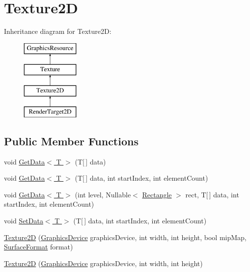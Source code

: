 \hypertarget{classMicrosoft_1_1Xna_1_1Framework_1_1Graphics_1_1Texture2D}{}\section{Texture2\+D}
\label{classMicrosoft_1_1Xna_1_1Framework_1_1Graphics_1_1Texture2D}
Inheritance diagram for Texture2\+D\+:\begin{figure}[H]
\begin{center}
\leavevmode
\includegraphics[height=4.000000cm]{classMicrosoft_1_1Xna_1_1Framework_1_1Graphics_1_1Texture2D}
\end{center}
\end{figure}
\subsection*{Public Member Functions}
\begin{DoxyCompactItemize}
\item 
void \hyperlink{classMicrosoft_1_1Xna_1_1Framework_1_1Graphics_1_1Texture2D_a4db4193c54536769560bdfec04150c1c}{Get\+Data$<$ T $>$} (T\mbox{[}$\,$\mbox{]} data)
\item 
void \hyperlink{classMicrosoft_1_1Xna_1_1Framework_1_1Graphics_1_1Texture2D_a7071a7e7f3c06f2f49080c2b5a18c87f}{Get\+Data$<$ T $>$} (T\mbox{[}$\,$\mbox{]} data, int start\+Index, int element\+Count)
\item 
void \hyperlink{classMicrosoft_1_1Xna_1_1Framework_1_1Graphics_1_1Texture2D_a48b43f20d59d4c2fe852c538f36e3e23}{Get\+Data$<$ T $>$} (int level, Nullable$<$ \hyperlink{structMicrosoft_1_1Xna_1_1Framework_1_1Rectangle}{Rectangle} $>$ rect, T\mbox{[}$\,$\mbox{]} data, int start\+Index, int element\+Count)
\item 
void \hyperlink{classMicrosoft_1_1Xna_1_1Framework_1_1Graphics_1_1Texture2D_af72400eac2ea582c9a148d1932182bc7}{Set\+Data$<$ T $>$} (T\mbox{[}$\,$\mbox{]} data, int start\+Index, int element\+Count)
\item 
\hyperlink{classMicrosoft_1_1Xna_1_1Framework_1_1Graphics_1_1Texture2D_a48893cead2a8a0961cb97894eb8a6d73}{Texture2\+D} (\hyperlink{classMicrosoft_1_1Xna_1_1Framework_1_1Graphics_1_1GraphicsDevice}{Graphics\+Device} graphics\+Device, int width, int height, bool mip\+Map, \hyperlink{namespaceMicrosoft_1_1Xna_1_1Framework_1_1Graphics_a2c30f3edaf443866b3c9b240306fdcc9}{Surface\+Format} format)
\item 
\hyperlink{classMicrosoft_1_1Xna_1_1Framework_1_1Graphics_1_1Texture2D_a4c968cf50c82f162cd2f911f05feb130}{Texture2\+D} (\hyperlink{classMicrosoft_1_1Xna_1_1Framework_1_1Graphics_1_1GraphicsDevice}{Graphics\+Device} graphics\+Device, int width, int height)
\end{DoxyCompactItemize}
